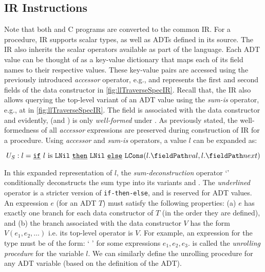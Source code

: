 \subsection{IR Instructions}
\label{sec:irops}
Note that both \SpecL{} and C programs are converted to the common IR.
For a \SpecL{} procedure, IR supports scalar types, as well as ADTs defined in its \SpecL{} source.
The IR also inherits the scalar operators available as part of the \SpecL{} language.
Each ADT value can be thought of as a key-value dictionary that maps each of its field names
to their respective values.
These key-value pairs are accessed using the previously introduced {\em accessor} operator,
e.g.,  and  represents the first and second fields of the
 data constructor in \cref{fig:llTraverseSpecIR}.
Recall that, the IR also allows querying the top-level variant of an ADT value using the
{\em sum-is} operator, e.g.,  at  in \cref{fig:llTraverseSpecIR}.
The  field is associated with the  data constructor and
evidently,  (and ) is only {\em well-formed} under .
As previously stated, the well-formedness of all {\em accessor} expressions are preserved during
construction of IR for a \SpecL{} procedure.
Using {\em accessor} and {\em sum-is} operators, a  value $l$ can be expanded as:

\begin{equation}
\label{eqn:specDeconstruct}
U_S: l = \sumIf{\sumIs{l}{LNil}} \  \sumThen{\cons{LNil}} \  \sumElse{\cons{LCons}(\prodAccess{l}{val}, \prodAccess{l}{next})}
\end{equation}

In this expanded representation of $l$,
the {\em sum-deconstruction} operator `\sumDtor{}'
conditionally deconstructs the sum type into its variants  and .
The {\em underlined} \sumDtor{} operator is a stricter version of {\tt if-then-else}, and is reserved for ADT values.
An \sumDtor{} expression $e$ (for an ADT $T$) must satisfy the following properties:
(a) $e$ has exactly one branch for each data constructor of $T$ (in the order they are defined),
and (b) the branch associated with the data constructor $V$ has the form $V(e_1,e_2,\dots)$ i.e. its top-level operator is $V$.
For example, an \sumDtor{} expression for the  type must be of the form:
`  ' for some expressions $e_1,e_2,e_3$.
 is called the {\em unrolling procedure} for the  variable $l$.
We can similarly define the unrolling procedure for any ADT variable (based on the definition of the ADT).

